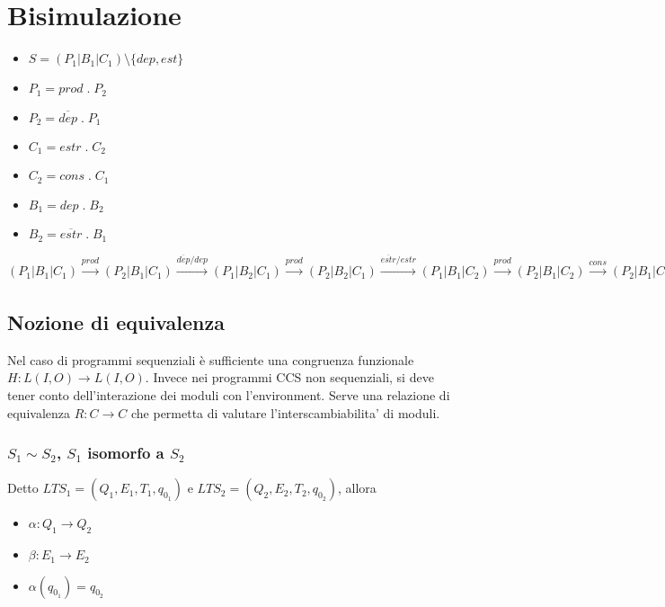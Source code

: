 \chapter{Bisimulazione}

\begin{itemize}
  \item $S = (P_1 | B_1 | C_1) \setminus \{dep, est\}$
  \item $P_1 = prod \; . \; P_2$
  \item $P_2 = \overline {dep} \; . \; P_1$
  \item $C_1 = estr \; . \; C_2$
  \item $C_2 = cons \; . \; C_1$
  \item $B_1 = dep \; . \; B_2$
  \item $B_2 = \overline {estr} \; . \; B_1$
\end{itemize}

$
(P_1 | B_1 | C_1)
\xrightarrow[]{prod} (P_2 | B_1 | C_1)
\xrightarrow[]{\overline {dep} / dep} (P_1 | B_2 | C_1)
\xrightarrow[]{prod} (P_2 | B_2 | C_1)
\xrightarrow[]{\overline {estr} / estr} (P_1 | B_1 | C_2)
\xrightarrow[]{prod} (P_2 | B_1 | C_2)
\xrightarrow[]{cons} (P_2 | B_1 | C_1)
$

\section{Nozione di equivalenza}

Nel caso di programmi sequenziali \`e sufficiente una congruenza funzionale $H: L(I, O) \rightarrow L(I, O)$.
Invece nei programmi CCS non sequenziali, si deve tener conto dell'interazione dei moduli con l'environment.
Serve una relazione di equivalenza $R : C \rightarrow C$ che permetta di valutare l'interscambiabilita' di moduli.

\subsection{$S_1 \sim S_2$, $S_1$ isomorfo a $S_2$}

Detto ${LTS}_1 = (Q_1, E_1, T_1, q_{0_1})$ e ${LTS}_2 = (Q_2, E_2, T_2, q_{0_2})$, allora

\begin{itemize}
  \item $\alpha : Q_1 \rightarrow Q_2$
  \item $\beta : E_1 \rightarrow E_2$
  \item $\alpha(q_{0_1}) = q_{0_2}$
\end{itemize}

